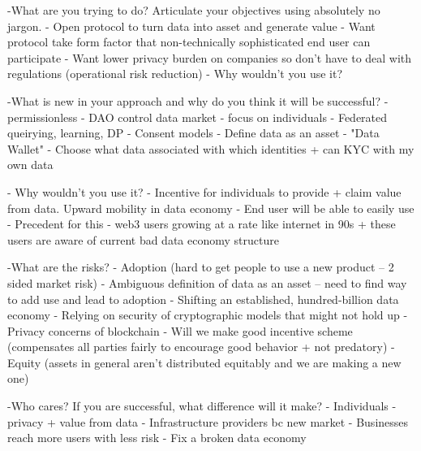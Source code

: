-What are you trying to do? Articulate your objectives using absolutely no jargon.
    - Open protocol to turn data into asset and generate value
    - Want protocol take form factor that non-technically sophisticated end user can participate
    - Want lower privacy burden on companies so don't have to deal with regulations (operational risk reduction)
    - Why wouldn't you use it?

-What is new in your approach and why do you think it will be successful?
    - permissionless - DAO control data market
    - focus on individuals
    - Federated queirying, learning, DP
    - Consent models
    - Define data as an asset
    - "Data Wallet"
    - Choose what data associated with which identities + can KYC with my own data
     
    
    - Why wouldn't you use it?
    - Incentive for individuals to provide + claim value from data. Upward mobility in data economy
    - End user will be able to easily use  
    - Precedent for this - web3 users growing at a rate like internet in 90s + these users are aware of current bad data economy structure

-What are the risks?
    - Adoption (hard to get people to use a new product -- 2 sided market risk)
    - Ambiguous definition of data as an asset -- need to find way to add use and lead to adoption
    - Shifting an established, hundred-billion data economy
    - Relying on security of cryptographic models that might not hold up
    - Privacy concerns of blockchain
    - Will we make good incentive scheme (compensates all parties fairly to encourage good behavior + not predatory)
    - Equity (assets in general aren't distributed equitably and we are making a new one)


-Who cares? If you are successful, what difference will it make?
    - Individuals - privacy + value from data
    - Infrastructure providers bc new market
    - Businesses reach more users with less risk
    - Fix a broken data economy


